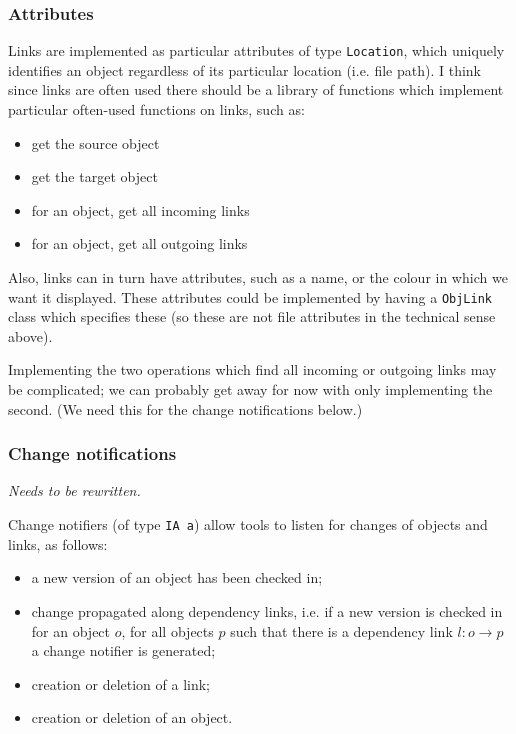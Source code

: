 \documentclass[a4paper]{article}
\begin{document}



\subsubsection{Attributes}

Links are implemented as particular attributes of type
\texttt{Location}, which uniquely identifies an object regardless of
its particular location (i.e. file path). I think since links are
often used there should be a library of functions which implement
particular often-used functions on links, such as:
\begin{itemize}
\item get the source object 
\item get the target object
\item for an object, get all incoming links
\item for an object, get all outgoing links
\end{itemize}

Also, links can in turn have attributes, such as a name, or the colour
in which we want it displayed. These attributes could be implemented
by having a \texttt{ObjLink} class which specifies these (so these are
not file attributes in the technical sense above).

Implementing the two operations which find all incoming or outgoing
links may be complicated; we can probably get away for now with only
implementing the second. (We need this for the change notifications
below.)

\subsubsection{Change notifications}

\emph{Needs to be rewritten.}

Change notifiers (of type \texttt{IA a}) allow tools to listen for
changes of objects and links, as follows:
\begin{itemize}
\item a new version of an object has been checked in;
\item change propagated along dependency links, i.e. if a new version
  is checked in for an object $o$, for all objects $p$ such that there
  is a dependency link $l:o\rightarrow p$ a change notifier is
  generated;
\item creation or deletion of a link;
\item creation or deletion of an object. 
\end{itemize}
\end{document}

